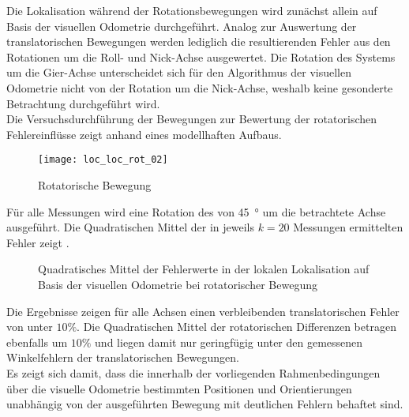 Die Lokalisation während der Rotationsbewegungen wird zunächst allein auf Basis der visuellen Odometrie durchgeführt. Analog zur Auswertung der translatorischen Bewegungen werden lediglich die resultierenden Fehler aus den Rotationen um die Roll- und Nick-Achse ausgewertet. Die Rotation des Systems um die Gier-Achse unterscheidet sich für den Algorithmus der visuellen Odometrie nicht von der Rotation um die Nick-Achse, weshalb keine gesonderte Betrachtung durchgeführt wird.\\
Die Versuchsdurchführung der Bewegungen zur Bewertung der rotatorischen Fehlereinflüsse zeigt  anhand eines modellhaften Aufbaus.\\

\prever{
}

\begin{figure}[!ht]
	\begin{center}
		\texttt{[image: loc\_loc\_rot\_02]}
		\caption{Rotatorische Bewegung}
		\label{fig.rotmove}
	\end{center}
\end{figure}

\prever{
}
Für alle Messungen wird eine Rotation des  von \SI{45}{°} um die betrachtete Achse ausgeführt. Die Quadratischen Mittel der in jeweils $k=20$ Messungen ermittelten Fehler zeigt .

\begin{figure}

\caption{Quadratisches Mittel der Fehlerwerte in der lokalen Lokalisation auf Basis der visuellen Odometrie bei rotatorischer Bewegung}
\label{fig.loc_loc_rot_fovis}
\end{figure}


Die Ergebnisse zeigen für alle Achsen einen verbleibenden translatorischen Fehler von unter $10\%$. Die Quadratischen Mittel der rotatorischen Differenzen betragen ebenfalls um $10\%$ und liegen damit nur geringfügig unter den gemessenen Winkelfehlern der translatorischen Bewegungen.\\
Es zeigt sich damit, dass die innerhalb der vorliegenden Rahmenbedingungen über die visuelle Odometrie bestimmten Positionen und Orientierungen unabhängig von der ausgeführten Bewegung mit deutlichen Fehlern behaftet sind.\\

